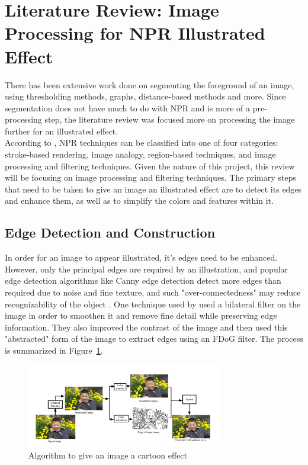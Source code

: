 \documentclass{article}
\begin{document}
\section{Literature Review: Image Processing for NPR Illustrated Effect}
\label{sec:litreview}

There has been extensive work done on segmenting the foreground of an image, using thresholding methods, graphs, distance-based methods and more. Since segmentation does not have much to do with NPR and is more of a pre-processing step, the literature review was focused more on processing the image further for an illustrated effect. \\


According to \cite{kumar_comprehensive_2019}, NPR techniques can be classified into one of four categories: stroke-based rendering, image analogy, region-based techniques, and image processing and filtering techniques. Given the nature of this project, this review will be focusing on image processing and filtering techniques. The primary steps that need to be taken to give an image an illustrated effect are to detect its edges and enhance them, as well as to simplify the colors and features within it.  

\subsection{Edge Detection and Construction}
\label{ssec:edge}
In order for an image to appear illustrated, it's edges need to be enhanced. However, only the principal edges are required by an illustration, and popular edge detection algorithms like Canny edge detection detect more edges than required due to noise and fine texture, and such "over-connectedness" may reduce recognizability of the object \cite{gooch_human_2004}. One technique used by \cite{lu_non-photorealistic_2013} used a bilateral filter on the image in order to smoothen it and remove fine detail while preserving edge information. They also improved the contrast of the image and then used this "abstracted" form of the image to  extract edges using an FDoG filter. The process is summarized in Figure~\ref{NPR_basic}.

\begin{figure}[H]
    \begin{minipage}[b]{1.0\linewidth}
      \centering
      \centerline{\includegraphics[width=8.5cm]{Figures/Fig1.png}}
    \end{minipage}
    \caption{Algorithm to give an image a cartoon effect \cite{lu_non-photorealistic_2013}}
    \label{NPR_basic}
\end{figure}
\end{document}
